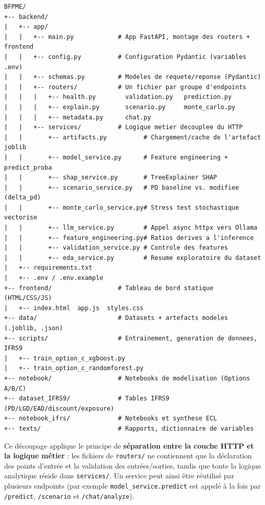 \begin{lstlisting}[caption={Arborescence simplifiée du projet}, label={lst:arbo}]
BFPME/
+-- backend/
|   +-- app/
|   |   +-- main.py            # App FastAPI, montage des routers + frontend
|   |   +-- config.py          # Configuration Pydantic (variables .env)
|   |   +-- schemas.py         # Modeles de requete/reponse (Pydantic)
|   |   +-- routers/           # Un fichier par groupe d'endpoints
|   |   |   +-- health.py        validation.py   prediction.py
|   |   |   +-- explain.py       scenario.py     monte_carlo.py
|   |   |   +-- metadata.py      chat.py
|   |   +-- services/          # Logique metier decouplee du HTTP
|   |       +-- artifacts.py          # Chargement/cache de l'artefact joblib
|   |       +-- model_service.py      # Feature engineering + predict_proba
|   |       +-- shap_service.py       # TreeExplainer SHAP
|   |       +-- scenario_service.py   # PD baseline vs. modifiee (delta_pd)
|   |       +-- monte_carlo_service.py# Stress test stochastique vectorise
|   |       +-- llm_service.py        # Appel async httpx vers Ollama
|   |       +-- feature_engineering.py# Ratios derives a l'inference
|   |       +-- validation_service.py # Controle des features
|   |       +-- eda_service.py        # Resume exploratoire du dataset
|   +-- requirements.txt
|   +-- .env / .env.example
+-- frontend/                  # Tableau de bord statique (HTML/CSS/JS)
|   +-- index.html  app.js  styles.css
+-- data/                      # Datasets + artefacts modeles (.joblib, .json)
+-- scripts/                   # Entrainement, generation de donnees, IFRS9
|   +-- train_option_c_xgboost.py
|   +-- train_option_c_randomforest.py
+-- notebook/                  # Notebooks de modelisation (Options A/B/C)
+-- dataset_IFRS9/             # Tables IFRS9 (PD/LGD/EAD/discount/exposure)
+-- notebook_ifrs/             # Notebooks et synthese ECL
+-- texts/                     # Rapports, dictionnaire de variables
\end{lstlisting}

Ce découpage applique le principe de \textbf{séparation entre la couche HTTP et la
logique métier} : les fichiers de \texttt{routers/} ne contiennent que la déclaration
des points d'entrée et la validation des entrées/sorties, tandis que toute la logique
analytique réside dans \texttt{services/}. Un service peut ainsi être réutilisé par
plusieurs endpoints (par exemple \texttt{model\_service.predict} est appelé à la fois
par \texttt{/predict}, \texttt{/scenario} et \texttt{/chat/analyze}).

